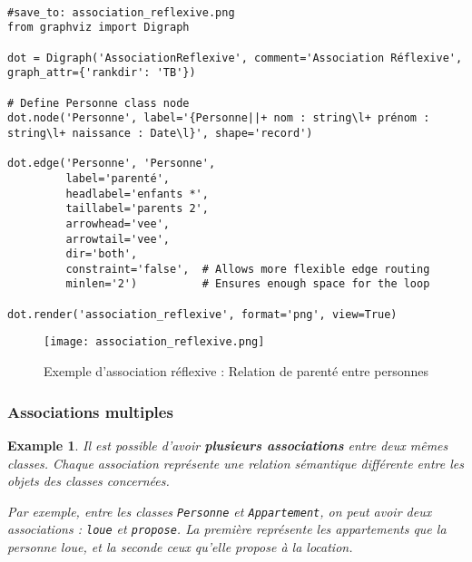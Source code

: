 \documentclass{article}
\newtheorem{example}{Example}
\begin{document}
\begin{verbatim}

#save_to: association_reflexive.png
from graphviz import Digraph

dot = Digraph('AssociationReflexive', comment='Association Réflexive', graph_attr={'rankdir': 'TB'})

# Define Personne class node
dot.node('Personne', label='{Personne||+ nom : string\l+ prénom : string\l+ naissance : Date\l}', shape='record')

dot.edge('Personne', 'Personne', 
         label='parenté', 
         headlabel='enfants *', 
         taillabel='parents 2',
         arrowhead='vee', 
         arrowtail='vee', 
         dir='both',
         constraint='false',  # Allows more flexible edge routing
         minlen='2')          # Ensures enough space for the loop

dot.render('association_reflexive', format='png', view=True)
\end{verbatim}

\begin{figure}[h]
    \centering
    \texttt{[image: association\_reflexive.png]}
    \caption{Exemple d'association réflexive : Relation de parenté entre personnes}
    \label{fig:association_reflexive}
\end{figure}


\subsubsection{Associations multiples}
\begin{example}
Il est possible d'avoir \textbf{plusieurs associations} entre deux mêmes classes. Chaque association représente une relation sémantique différente entre les objets des classes concernées.

Par exemple, entre les classes \texttt{Personne} et \texttt{Appartement}, on peut avoir deux associations : \texttt{loue} et \texttt{propose}. La première représente les appartements que la personne loue, et la seconde ceux qu'elle propose à la location.
\end{example}
\end{document}
